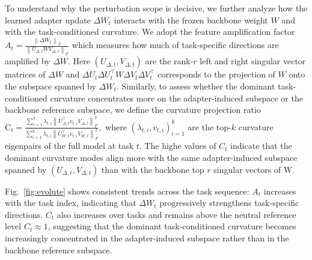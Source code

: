 \documentclass{article}
\theoremstyle{plain}
\theoremstyle{definition}
\theoremstyle{remark}
\begin{document}
To understand why the perturbation scope is decisive, we further analyze how the learned adapter update $\Delta W_t$ interacts with the frozen backbone weight $W$ and with the task-conditioned curvature.
We adopt the feature amplification factor~\cite{hu2022lora}
$
A_t =
\frac{\left\lVert \Delta W_{t}\right\rVert_F}
{\left\lVert U_{\Delta,t} W  V_{\Delta,t}\right\rVert_F}
$
which measures how much of task-specific directions are amplified by $\Delta W$.
Here $(U_{\Delta,t},V_{\Delta,t})$ are the rank-$r$ left and right singular vector matrices of $\Delta W $
and $\Delta U_t \Delta U_t^\top W \Delta V_t\Delta V_t^\top$ corresponds to the projection of $W$ onto the subspace spanned by $\Delta W_t$.
Similarly, to assess whether the dominant task-conditioned curvature
concentrates more on the adapter-induced subspace or the backbone reference subspace, we define the curvature projection ratio 
$
\text{C}_t=\frac{\sum_{i=1}^k \lambda_{t, i}\left\|U_{\Delta, t}^{\top} v_{t, i} V_{\Delta, t}\right\|_F^2}{\sum_{i=1}^k \lambda_{t, i}\left\|U_{W, t}^{\top} v_{t, i} V_{W, t}\right\|_F^2},
$
where ${(\lambda_{t,i},v_{t,i})}_{i=1}^k$ are the top-$k$ curvature eigenpairs of the full model at task $t$. The highe values of $C_t$ indicate that the dominant curvature modes align more with the same adapter-induced subspace spanned by  $(U_{\Delta,t},V_{\Delta,t})$ than with the backbone top $r$ singular vectors of W.



Fig.~\ref{fig:evolute} shows consistent trends across the task sequence: $A_t$ increases with the task index, indicating that $\Delta W_t$ progressively strengthens task-specific directions. $C_t$ also increases over tasks and remains above the neutral reference level $C_t\approx 1$, suggesting that the dominant task-conditioned curvature becomes increasingly concentrated in the adapter-induced subspace rather than in the backbone reference subspace.
\end{document}
